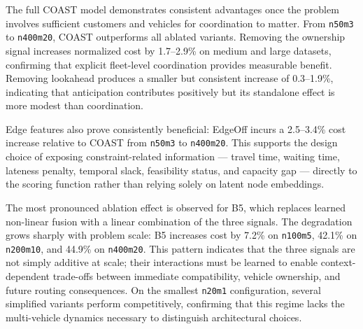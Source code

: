 \documentclass[conference]{IEEEtran}
\begin{document}
The full COAST model demonstrates consistent advantages once the problem involves sufficient customers and vehicles for coordination to matter. From \texttt{n50m3} to \texttt{n400m20}, COAST outperforms all ablated variants. Removing the ownership signal increases normalized cost by 1.7--2.9\% on medium and large datasets, confirming that explicit fleet-level coordination provides measurable benefit. Removing lookahead produces a smaller but consistent increase of 0.3--1.9\%, indicating that anticipation contributes positively but its standalone effect is more modest than coordination.

Edge features also prove consistently beneficial: EdgeOff incurs a 2.5--3.4\% cost increase relative to COAST from \texttt{n50m3} to \texttt{n400m20}. This supports the design choice of exposing constraint-related information --- travel time, waiting time, lateness penalty, temporal slack, feasibility status, and capacity gap --- directly to the scoring function rather than relying solely on latent node embeddings.

The most pronounced ablation effect is observed for B5, which replaces learned non-linear fusion with a linear combination of the three signals. The degradation grows sharply with problem scale: B5 increases cost by 7.2\% on \texttt{n100m5}, 42.1\% on \texttt{n200m10}, and 44.9\% on \texttt{n400m20}. This pattern indicates that the three signals are not simply additive at scale; their interactions must be learned to enable context-dependent trade-offs between immediate compatibility, vehicle ownership, and future routing consequences. On the smallest \texttt{n20m1} configuration, several simplified variants perform competitively, confirming that this regime lacks the multi-vehicle dynamics necessary to distinguish architectural choices.
\end{document}
